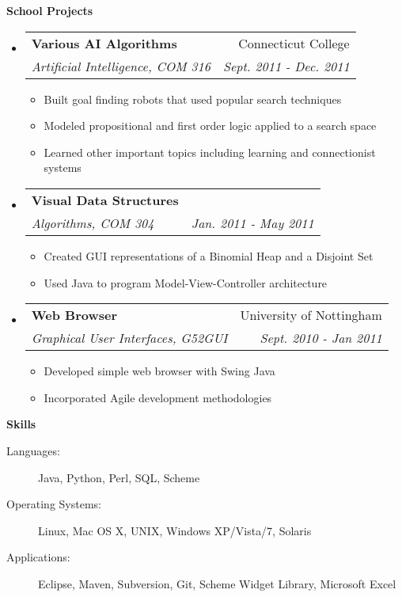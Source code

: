 \documentclass[letterpaper,11pt]{article}
\makeatletter
\newcommand{\resitem}[1]{\item #1 \vspace{-2pt}}
\newcommand{\resheading}[1]{{\large \colorbox{mygrey}{\begin{minipage}{\textwidth}{\textbf{#1 \vphantom{p\^{E}}}}\end{minipage}}}}
\newcommand{\ressubheading}[4]{
\begin{tabular*}{7.0in}{l@{\extracolsep{\fill}}r}
		\textbf{#1} & #2 \\
		\textit{#3} & \textit{#4} \\
\end{tabular*}\vspace{-6pt}}
\makeatother
\begin{document}
\resheading{School Projects}
\begin{itemize}
	\item
	\ressubheading{Various AI Algorithms}{Connecticut College}{Artificial Intelligence, COM 316}{Sept. 2011 - Dec. 2011}
	\begin{itemize}
		\resitem{Built goal finding robots that used popular search techniques}
		\resitem{Modeled propositional and first order logic applied to a search space}
		\resitem{Learned other important topics including learning and connectionist systems}
	\end{itemize}
	
	\item
	\ressubheading{Visual Data Structures}{}{Algorithms, COM 304}{Jan. 2011 - May 2011}
	\begin{itemize}
		\resitem{Created GUI representations of a Binomial Heap and a Disjoint Set}
		\resitem{Used Java to program Model-View-Controller architecture}
	\end{itemize}

	\item
	\ressubheading{Web Browser}{University of Nottingham}{Graphical User Interfaces, G52GUI}{Sept. 2010 - Jan 2011}
	\begin{itemize}
		\resitem{Developed simple web browser with Swing Java}
		\resitem{Incorporated Agile development methodologies}
	\end{itemize}
\end{itemize}

\resheading{Skills}
\begin{description}
	\item[Languages:]
		Java, Python, Perl, SQL, Scheme
	\item[Operating Systems:]
		Linux, Mac OS X, {\sc UNIX}, Windows XP/Vista/7, Solaris
	\item[Applications:]
		Eclipse, Maven, Subversion, Git, Scheme Widget Library, Microsoft Excel
\end{description}
\end{document}

